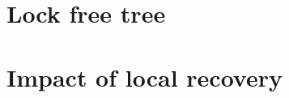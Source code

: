\section{Lock free tree}
\label{sec:experiments:icdcn}

\section{Impact of local recovery}
\label{sec:experiments:localRecovery}

%